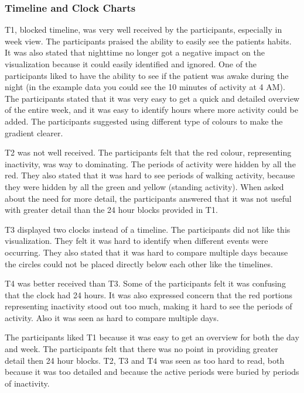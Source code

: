 \subsubsection{Timeline and Clock Charts}
T1, blocked timeline, was very well received by the participants, especially in week view. The participants praised the ability to easily see the patients habits. It was also stated that nighttime no longer got a negative impact on the visualization because it could easily identified and ignored. One of the participants liked to have the ability to see if the patient was awake during the night (in the example data you could see the 10 minutes of activity at 4 AM). The participants stated that it was very easy to get a quick and detailed overview of the entire week, and it was easy to identify hours where more activity could be added. The participants suggested using different type of colours to make the gradient clearer.

T2 was not well received. The participants felt that the red colour, representing inactivity, was way to dominating. The periods of activity were hidden by all the red. They also stated that it was hard to see periods of walking activity, because they were hidden by all the green and yellow (standing activity). When asked about the need for more detail, the participants answered that it was not useful with greater detail than the 24 hour blocks provided in T1.

T3 displayed two clocks instead of a timeline. The participants did not like this visualization. They felt it was hard to identify when different events were occurring. They also stated that it was hard to compare multiple days because the circles could not be placed directly below each other like the timelines.

T4 was better received than T3. Some of the participants felt it was confusing that the clock had 24 hours. It was also expressed concern that the red portions representing inactivity stood out too much, making it hard to see the periods of activity. Also it was seen as hard to compare multiple days.

The participants liked T1 because it was easy to get an overview for both the day and week. The participants felt that there was no point in providing greater detail then 24 hour blocks. T2, T3 and T4 was seen as too hard to read, both because it was too detailed and because the active periods were buried by periods of inactivity.

